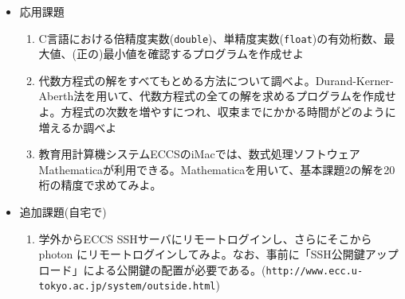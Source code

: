 \documentclass[11pt]{jarticle}
\begin{document}
\begin{itemize}
\item 応用課題
  \begin{enumerate}
  \item C言語における倍精度実数({\tt double})、単精度実数({\tt float})の有効桁数、最大値、(正の)最小値を確認するプログラムを作成せよ
  \item 代数方程式の解をすべてもとめる方法について調べよ。Durand-Kerner-Aberth法を用いて、代数方程式の全ての解を求めるプログラムを作成せよ。方程式の次数を増やすにつれ、収束までにかかる時間がどのように増えるか調べよ
  \item 教育用計算機システムECCSのiMacでは、数式処理ソフトウェアMathematicaが利用できる。Mathematicaを用いて、基本課題2の解を20桁の精度で求めてみよ。
  \end{enumerate}  

\item 追加課題(自宅で)
  \begin{enumerate}
  \item 学外からECCS SSHサーバにリモートログインし、さらにそこから photon にリモートログインしてみよ。なお、事前に「SSH公開鍵アップロード」による公開鍵の配置が必要である。(\verb+http://www.ecc.u-tokyo.ac.jp/system/outside.html+)
  \end{enumerate}

\end{itemize}
\end{document}
